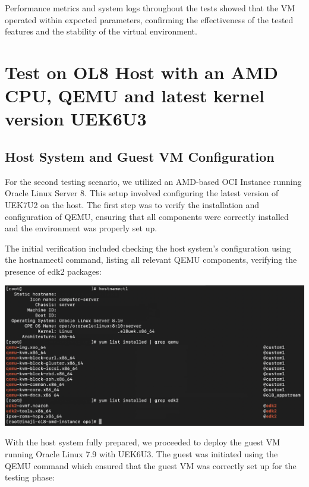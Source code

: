Performance metrics and system logs throughout the tests showed that the VM operated within expected parameters, confirming the effectiveness of the tested features and the stability of the virtual environment.

\section{Test on OL8 Host with an AMD CPU, QEMU and latest kernel version UEK6U3}

\subsection{Host System and Guest VM Configuration}

For the second testing scenario, we utilized an AMD-based OCI Instance running Oracle Linux Server 8. This setup involved configuring the latest version of UEK7U2 on the host. The first step was to verify the installation and configuration of QEMU, ensuring that all components were correctly installed and the environment was properly set up.

The initial verification included checking the host system's configuration using the hostnamectl command, listing all relevant QEMU components, verifying the presence of edk2 packages:

\begin{center}
    \centering
    \includegraphics[width=\textwidth]{Images/Host System Configuration Verification.png}
    \label{fig:casa}
\end{center}

With the host system fully prepared, we proceeded to deploy the guest VM running Oracle Linux 7.9 with UEK6U3. The guest was initiated using the QEMU command which ensured that the guest VM was correctly set up for the testing phase:

